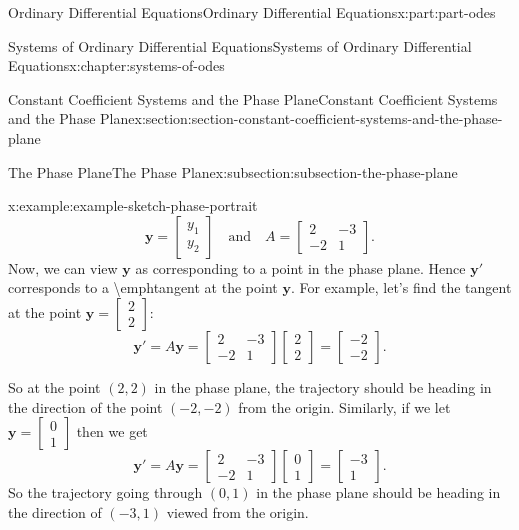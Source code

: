 \documentclass[twoside,10pt,]{book}
\numberwithin{equation}{part}
\renewcommand{\vec}[1]{\mathbf{#1}}
\newcommand{\amp}{&}
\begin{document}
\begin{partptx}{Ordinary Differential Equations}{}{Ordinary Differential Equations}{}{}{x:part:part-odes}
\begin{chapterptx}{Systems of Ordinary Differential Equations}{}{Systems of Ordinary Differential Equations}{}{}{x:chapter:systems-of-odes}
\begin{sectionptx}{Constant Coefficient Systems and the Phase Plane}{}{Constant Coefficient Systems and the Phase Plane}{}{}{x:section:section-constant-coefficient-systems-and-the-phase-plane}
\begin{subsectionptx}{The Phase Plane}{}{The Phase Plane}{}{}{x:subsection:subsection-the-phase-plane}
\begin{example}{}{x:example:example-sketch-phase-portrait}
\begin{equation*}
\vec{y} = \begin{bmatrix}y_{1}\\y_{2}\end{bmatrix}\quad\text{and}\quad A = \begin{bmatrix}2 \amp  -3 \\-2 \amp  1\end{bmatrix}.
\end{equation*}
Now, we can view \(\vec{y}\) as corresponding to a point in the phase plane. Hence \(\vec{y}'\) corresponds to a \textbackslash{}emph\textbraceleft{}tangent\textbraceright{} at the point \(\vec{y}\). For example, let's find the tangent at the point \(\vec{y} = \begin{bmatrix}2\\2\end{bmatrix}\):%
\begin{equation*}
\vec{y}' = A\vec{y} = \begin{bmatrix}2 \amp  -3 \\ -2 \amp  1\end{bmatrix}\begin{bmatrix}2\\2\end{bmatrix} = \begin{bmatrix}-2 \\ -2\end{bmatrix}.
\end{equation*}
%
\par
So at the point \((2,2)\) in the phase plane, the trajectory should be heading in the direction of the point \((-2,-2)\) from the origin. Similarly, if we let \(\vec{y} = \begin{bmatrix}0\\1\end{bmatrix}\) then we get%
\begin{equation*}
\vec{y}' = A\vec{y} = \begin{bmatrix}2 \amp  -3 \\ -2 \amp  1\end{bmatrix}\begin{bmatrix}0\\1\end{bmatrix} = \begin{bmatrix}-3 \\ 1\end{bmatrix}.
\end{equation*}
So the trajectory going through \((0,1)\) in the phase plane should be heading in the direction of \((-3,1)\) viewed from the origin.%

\end{example}
\end{subsectionptx}
\end{sectionptx}
\end{chapterptx}
\end{partptx}
\end{document}
